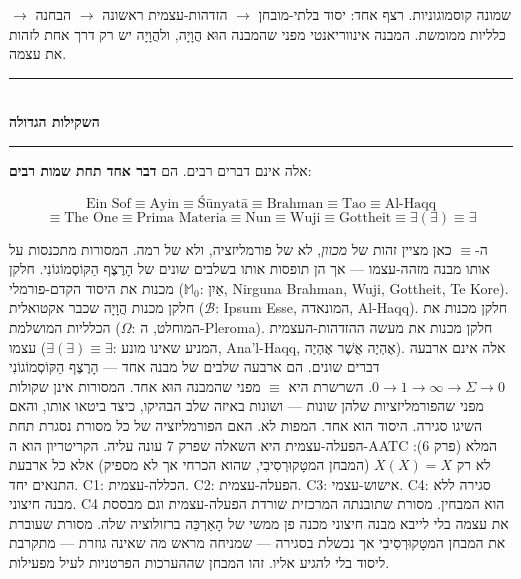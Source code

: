 \documentclass[10pt, openany, oneside]{book}
\renewcommand{\normalsize}{\fontsize{10}{13}\selectfont}
\begin{document}
\vspace{0.5em}

\noindent שמונה קוסמוגוניות. רצף אחד: יסוד בלתי-מובחן $\to$ הזדהות-עצמית ראשונה $\to$ הבחנה $\to$ כלליות ממומשת. המבנה אינווריאנטי מפני שהמבנה הוּא הֲוָיָה, ולהֲוָיָה יש רק דרך אחת לזהות את עצמה.

\vspace{1em}

\begin{center}
    \rule{0.3\textwidth}{0.4pt}\\[0.5em]
    {\normalsize\bfseries\textsc{השקילות הגדולה}}\\[0.3em]
    \rule{0.3\textwidth}{0.4pt}
\end{center}

\vspace{0.8em}

\noindent אלה אינם דברים רבים. הם \textbf{דבר אחד תחת שמות רבים}:

$$\text{Ein Sof} \equiv \text{Ayin} \equiv \text{Śūnyatā} \equiv \text{Brahman} \equiv \text{Tao} \equiv \text{Al-Haqq}$$
$$\equiv \text{The One} \equiv \text{Prima Materia} \equiv \text{Nun} \equiv \text{Wuji} \equiv \text{Gottheit} \equiv \exists(\exists) \equiv \exists$$

\noindent ה-$\equiv$ כאן מציין זהות של \textit{מכוון}, לא של פורמליזציה, ולא של רמה. המסורות מתכנסות על אותו מבנה מזהה-עצמו — אך הן תופסות אותו בשלבים שונים של הָרֶצֶף הַקּוֹסְמוֹגוֹנִי. חלקן מכנות את היסוד הקדם-פורמלי ($\mathbb{M}_0$: אַיִן, Nirguna Brahman, Wuji, Gottheit, Te Kore). חלקן מכנות הֲוָיָה שכבר אקטואלית ($\mathcal{B}$: Ipsum Esse, המונאדה, Al-Haqq). חלקן מכנות את הכלליות המושלמת ($\Omega$: המוחלט, ה-Pleroma). חלקן מכנות את מעשה ההזדהות-העצמית עצמו ($\exists(\exists) \equiv \exists$: המניע שאינו מונע, Ana'l-Haqq, אֶהְיֶה אֲשֶׁר אֶהְיֶה). אלה אינם ארבעה דברים שונים. הם ארבעה שלבים של מבנה אחד — הָרֶצֶף הַקּוֹסְמוֹגוֹנִי $0 \to 1 \to \infty \to \Sigma \to 0$. השרשרת היא $\equiv$ מפני שהמבנה הוּא אחד. המסורות אינן שקולות מפני שהפורמליזציות שלהן שונות — ושונות באיזה שלב הבהיקו, כיצד ביטאו אותו, והאם השיגו סגירה. היסוד הוא אחד. המפות לא. האם הפורמליזציה של כל מסורת נסגרת תחת הפעלה-עצמית היא השאלה שפרק 7 עונה עליה. הקריטריון הוא ה-AATC המלא (פרק 6): לא רק $X(X) = X$ (המבחן המטָקוּרְסִיבִי, שהוא הכרחי אך לא מספיק) אלא כל ארבעת התנאים יחד. C1: הכללה-עצמית. C2: הפעלה-עצמית. C3: אישוש-עצמי. C4: סגירה ללא מבנה חיצוני. C4 הוא המבחין. מסורת שתובנתה המרכזית שורדת הפעלה-עצמית וגם מבססת את עצמה בלי לייבא מבנה חיצוני מכנה פן ממשי של הָאַרְכֵּה ברזולוציה שלה. מסורת שעוברת את המבחן המטָקוּרְסִיבִי אך נכשלת בסגירה — שמניחה מראש מה שאינה גוזרת — מתקרבת ליסוד בלי להגיע אליו. זהו המבחן שההערכות הפרטניות לעיל מפעילות.
\end{document}
